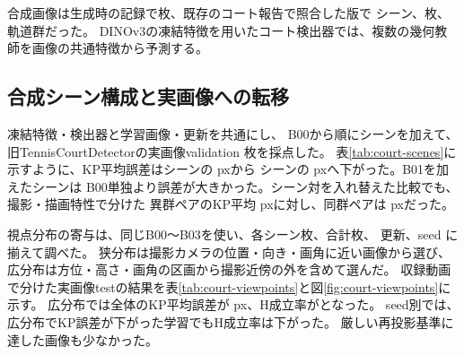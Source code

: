 合成画像は生成時の記録で枚、既存のコート報告で照合した版で
シーン、枚、軌道群だった。
DINOv3\cite{dinov3}の凍結特徴を用いたコート検出器では、複数の幾何教師を画像の共通特徴から予測する。

\subsection{合成シーン構成と実画像への転移}

凍結特徴・検出器と学習画像・更新を共通にし、
B00から順にシーンを加えて、旧TennisCourtDetectorの実画像validation 枚を採点した。
表\ref{tab:court-scenes}に示すように、KP平均誤差はシーンの pxから
シーンの pxへ下がった。B01を加えたシーンは
B00単独より誤差が大きかった。シーン対を入れ替えた比較でも、撮影・描画特性で分けた
異群ペアのKP平均 pxに対し、同群ペアは pxだった。

\begin{table}[tbp]
\centering
\caption{合成シーン数を変えた比較。実画像は全行で同じvalidation、KPの単位は長辺設定のモデル入力px。seedは。}
\label{tab:court-scenes}
\small

\end{table}

視点分布の寄与は、同じB00〜B03を使い、各シーン枚、合計枚、
更新、seed に揃えて調べた。
狭分布は撮影カメラの位置・向き・画角に近い画像から選び、広分布は方位・高さ・画角の区画から撮影近傍の外を含めて選んだ。
収録動画で分けた実画像testの結果を表\ref{tab:court-viewpoints}と図\ref{fig:court-viewpoints}に示す。
広分布では全体のKP平均誤差が px、H成立率がとなった。
seed別では、広分布でKP誤差が下がった学習でもH成立率は下がった。
厳しい再投影基準に達した画像も少なかった。

\begin{table}[tbp]
\centering
\caption{撮影近傍と広い視点分布。KP平均は可視点を集計した長辺換算px、H成立率は写像を得た画像の割合。両指標ともseedを等重みで平均。}
\label{tab:court-viewpoints}
\small

\end{table}

